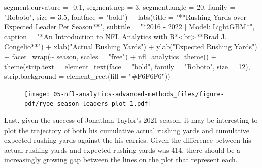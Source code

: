 \documentclass[
  letterpaper,
]{krantz}
\newenvironment{Shaded}{\begin{snugshade}}{\end{snugshade}}
\newcommand{\AttributeTok}[1]{\textcolor[rgb]{0.40,0.45,0.13}{#1}}
\newcommand{\DecValTok}[1]{\textcolor[rgb]{0.68,0.00,0.00}{#1}}
\newcommand{\FloatTok}[1]{\textcolor[rgb]{0.68,0.00,0.00}{#1}}
\newcommand{\FunctionTok}[1]{\textcolor[rgb]{0.28,0.35,0.67}{#1}}
\newcommand{\NormalTok}[1]{\textcolor[rgb]{0.00,0.23,0.31}{#1}}
\newcommand{\SpecialCharTok}[1]{\textcolor[rgb]{0.37,0.37,0.37}{#1}}
\newcommand{\StringTok}[1]{\textcolor[rgb]{0.13,0.47,0.30}{#1}}
\begin{document}
\begin{Shaded}
\begin{Highlighting}[]
                  \AttributeTok{segment.curvature =} \SpecialCharTok{{-}}\FloatTok{0.1}\NormalTok{,}
                  \AttributeTok{segment.ncp =} \DecValTok{3}\NormalTok{, }\AttributeTok{segment.angle =} \DecValTok{20}\NormalTok{,}
                  \AttributeTok{family =} \StringTok{"Roboto"}\NormalTok{, }\AttributeTok{size =} \FloatTok{3.5}\NormalTok{,}
                  \AttributeTok{fontface =} \StringTok{"bold"}\NormalTok{) }\SpecialCharTok{+}
  \FunctionTok{labs}\NormalTok{(}\AttributeTok{title =} \StringTok{"**Rushing Yards over Expected Leader Per Season**"}\NormalTok{,}
       \AttributeTok{subtitle =} \StringTok{"*2016 {-} 2022 | Model: LightGBM*"}\NormalTok{,}
       \AttributeTok{caption =} \StringTok{"*An Introduction to NFL Analytics with R*\textless{}br\textgreater{}**Brad J. Congelio**"}\NormalTok{) }\SpecialCharTok{+}
  \FunctionTok{xlab}\NormalTok{(}\StringTok{"Actual Rushing Yards"}\NormalTok{) }\SpecialCharTok{+}
  \FunctionTok{ylab}\NormalTok{(}\StringTok{"Expected Rushing Yards"}\NormalTok{) }\SpecialCharTok{+}
  \FunctionTok{facet\_wrap}\NormalTok{(}\SpecialCharTok{\textasciitilde{}}\NormalTok{ season, }\AttributeTok{scales =} \StringTok{"free"}\NormalTok{) }\SpecialCharTok{+}
  \FunctionTok{nfl\_analytics\_theme}\NormalTok{() }\SpecialCharTok{+}
  \FunctionTok{theme}\NormalTok{(}\AttributeTok{strip.text =} \FunctionTok{element\_text}\NormalTok{(}\AttributeTok{face =} \StringTok{"bold"}\NormalTok{, }\AttributeTok{family =} \StringTok{"Roboto"}\NormalTok{, }\AttributeTok{size =} \DecValTok{12}\NormalTok{),}
        \AttributeTok{strip.background =} \FunctionTok{element\_rect}\NormalTok{(}\AttributeTok{fill =} \StringTok{"\#F6F6F6"}\NormalTok{))}
\end{Highlighting}
\end{Shaded}

\begin{figure}[H]

{\centering \texttt{[image: 05-nfl-analytics-advanced-methods\_files/figure-pdf/ryoe-season-leaders-plot-1.pdf]}

}

\end{figure}

Last, given the success of Jonathan Taylor's 2021 season, it may be
interesting to plot the trajectory of both his cumulative actual rushing
yards and cumulative expected rushing yards against the his carries.
Given the difference between his actual rushing yards and expected
rushing yards was 414, there should be a increasingly growing gap
between the lines on the plot that represent each.
\end{document}
